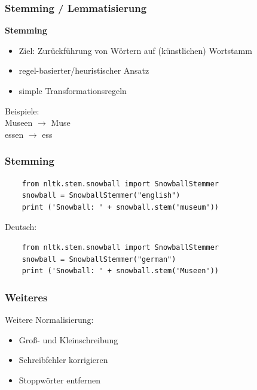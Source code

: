     
\begin{frame}
    \frametitle{Stemming / Lemmatisierung}

    \textbf{Stemming}
    \begin{itemize}
    \item Ziel: Zurückführung von Wörtern auf (künstlichen) Wortstamm
    \item regel-basierter/heuristischer Ansatz
    \item simple Transformationsregeln
    \end{itemize}

    Beispiele: \\
    Museen $\rightarrow$ Muse\\
    essen $\rightarrow$ ess
    
\end{frame}
    
    
\begin{frame}[fragile]
    \frametitle{Stemming}

    \begin{verbatim}
    from nltk.stem.snowball import SnowballStemmer
    snowball = SnowballStemmer("english")
    print ('Snowball: ' + snowball.stem('museum'))
    \end{verbatim}

    Deutsch:
    \begin{verbatim}
    from nltk.stem.snowball import SnowballStemmer
    snowball = SnowballStemmer("german")
    print ('Snowball: ' + snowball.stem('Museen'))
    \end{verbatim}
    \end{frame}
    
    
    \begin{frame}
    \frametitle{Weiteres}
    Weitere Normalisierung:

    \begin{itemize}
    \item Groß- und Kleinschreibung
    \item Schreibfehler korrigieren
    \item Stoppwörter entfernen
    \end{itemize}
\end{frame}
     
